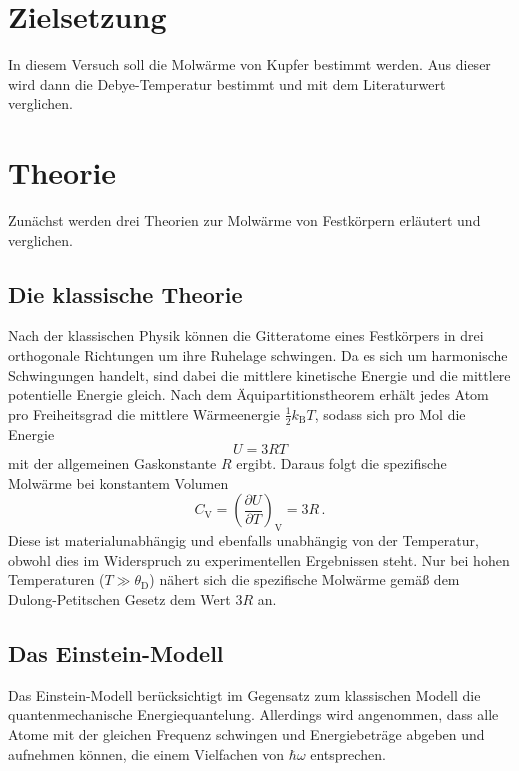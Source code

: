 \section{Zielsetzung}
In diesem Versuch soll die Molwärme von Kupfer bestimmt werden. Aus dieser wird
dann die Debye-Temperatur bestimmt und mit dem Literaturwert verglichen.

\section{Theorie}
Zunächst werden drei Theorien zur Molwärme von Festkörpern erläutert und verglichen.
\subsection{Die klassische Theorie}
Nach der klassischen Physik können die Gitteratome eines Festkörpers in drei orthogonale
Richtungen um ihre Ruhelage schwingen. Da es sich um harmonische Schwingungen handelt, sind
dabei die mittlere kinetische Energie und die mittlere potentielle Energie gleich. Nach dem
Äquipartitionstheorem erhält jedes Atom pro Freiheitsgrad die mittlere Wärmeenergie $\frac{1}{2}k_\text{B}T$,
sodass sich pro Mol die Energie
\begin{equation}
  U = 3RT
\end{equation}
mit der allgemeinen Gaskonstante $R$ ergibt. Daraus folgt die spezifische Molwärme bei konstantem Volumen
\begin{equation}
  C_\text{V} = \left(\frac{\partial U}{\partial T}\right)_\text{V} = 3R \,.
\end{equation}
Diese ist materialunabhängig und ebenfalls unabhängig von der Temperatur, obwohl dies im Widerspruch zu experimentellen
Ergebnissen steht. Nur bei hohen Temperaturen ($T \gg \theta_\text{D}$) nähert sich die spezifische Molwärme gemäß
dem Dulong-Petitschen Gesetz dem Wert $3R$ an.

\subsection{Das Einstein-Modell}
Das Einstein-Modell berücksichtigt im Gegensatz zum klassischen Modell die quantenmechanische Energiequantelung. Allerdings
wird angenommen, dass alle Atome mit der gleichen Frequenz schwingen und Energiebeträge abgeben und aufnehmen können, die einem
Vielfachen von $\hbar\omega$ entsprechen.

